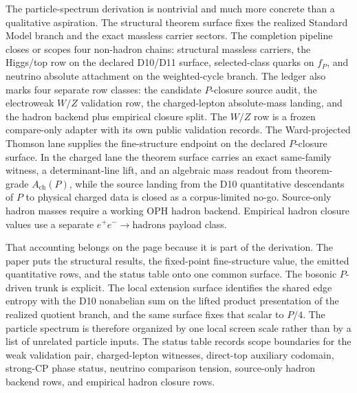 \documentclass[11pt]{article}
\begin{document}
The particle-spectrum derivation is nontrivial and much more concrete than a qualitative aspiration.
The structural theorem surface fixes the realized Standard Model branch and the exact massless
carrier sectors. The completion pipeline closes or scopes four non-hadron chains: structural
massless carriers, the Higgs/top row on the declared D10/D11 surface, selected-class quarks on
\(f_P\), and neutrino absolute attachment on the weighted-cycle branch. The ledger also marks four
separate row classes: the candidate \(P\)-closure source audit, the electroweak \(W/Z\) validation
row, the charged-lepton absolute-mass landing, and the hadron backend plus empirical closure split.
The \(W/Z\) row is a frozen compare-only adapter with its own public validation records. The
Ward-projected Thomson lane supplies the fine-structure endpoint on the declared \(P\)-closure
surface. In the charged lane the theorem surface carries an exact
same-family witness, a determinant-line lift, and an algebraic mass readout from
theorem-grade \(A_{\mathrm{ch}}(P)\), while the source landing from the D10 quantitative
descendants of \(P\) to physical charged data is closed as a corpus-limited no-go. Source-only
hadron masses require a working OPH hadron backend. Empirical hadron closure values use a
separate \(e^+e^-\to\mathrm{hadrons}\) payload class.

That accounting belongs on the page because it is part of the derivation. The paper puts the
structural results, the fixed-point fine-structure value, the emitted quantitative rows, and the
status table onto one common surface. The bosonic \(P\)-driven trunk is explicit. The local
extension surface identifies the shared edge entropy with the D10 nonabelian sum on the lifted
product presentation of the realized quotient branch, and the same surface fixes that scalar to
\(P/4\). The particle spectrum is therefore organized by one local screen scale rather than by a
list of unrelated particle inputs. The status table records scope boundaries for the weak validation
pair, charged-lepton witnesses, direct-top auxiliary codomain, strong-CP phase status,
neutrino comparison tension, source-only hadron backend rows, and empirical hadron closure rows.

\appendix

\end{document}
